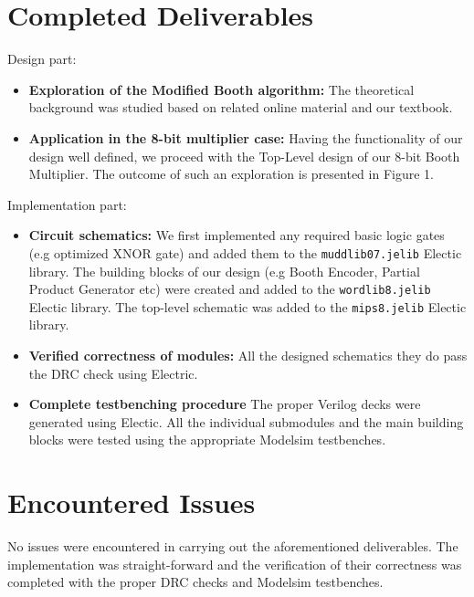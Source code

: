 \documentclass[conference]{IEEEtran}
\begin{document}
\section{Completed Deliverables\cite{gitDel}}
Design part:
\begin{itemize}
\item \textbf{Exploration of the Modified Booth algorithm:}
The theoretical background was studied based on 
related online material and our textbook\cite{tb}.

\item \textbf{Application in the 8-bit multiplier case:}
Having the functionality of our design 
well defined, we proceed with the Top-Level design 
of our 8-bit Booth Multiplier.
The outcome of such an exploration is presented
in Figure 1.

\end{itemize}

Implementation part:
\begin{itemize}
\item \textbf{Circuit schematics:}
We first implemented 
any required basic logic gates (e.g optimized 
XNOR gate) and added them to the
\texttt{muddlib07.jelib} Electic library.
The building blocks of our design
(e.g Booth Encoder, Partial Product Generator etc)
were created and added to the
\texttt{wordlib8.jelib} Electic library.
The top-level schematic was added to 
the \texttt{mips8.jelib} Electic library.


\item \textbf{Verified correctness of modules:}
All the designed schematics they do pass the 
DRC check using Electric.

\item \textbf{Complete testbenching procedure}
The proper Verilog decks were generated using
Electic. All the individual submodules and the
main building blocks were tested using the 
appropriate Modelsim testbenches.

\end{itemize}




\section{Encountered Issues}

No issues were encountered
in carrying out	the aforementioned 
deliverables. The implementation was
straight-forward and the verification
of their correctness was completed with
the proper DRC checks and Modelsim 
testbenches.
\end{document}
